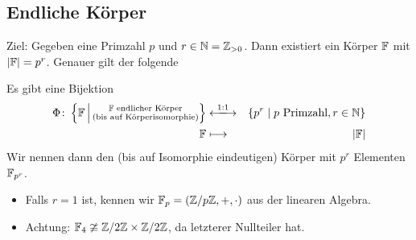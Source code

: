 \documentclass[12pt,a4paper]{scrartcl}
\begin{document}
\subsection{Endliche Körper}
Ziel: Gegeben eine Primzahl $p$ und $r\in\mathbb N= \mathbb Z_{>0}$. Dann existiert ein Körper $\mathbb F$ mit $|\mathbb F| = p^r$. Genauer gilt der folgende
\begin{satz}\label{thm:17.1}
	Es gibt eine Bijektion
	\begin{eqnarray*}
		\Phi\colon\left\{\IF\,\middle|\,\substack{\text{$\IF$ endlicher Körper}\\\text{\textup(bis auf Körperisomorphie\textup)}}\right\}& \xlongleftrightarrow{1:1}& \{p^r\mid \text{$p$ Primzahl}, r\in\IN\}\\
		\IF & \longmapsto & |\IF|
	\end{eqnarray*}
	Wir nennen dann den \textup(bis auf Isomorphie eindeutigen\textup) Körper mit $p^r$ Elementen $\mathbb F_{p^r}$.
\end{satz}
\begin{bem}
	\leavevmode
	\begin{itemize}
		\item Falls $r = 1$ ist, kennen wir $\mathbb F_p = (\mathbb Z/p\mathbb Z, +, \cdot)$ aus der linearen Algebra.
		\item Achtung: $\mathbb F_4 \ncong \mathbb Z/2\mathbb Z\times \mathbb Z/2\mathbb Z$, da letzterer Nullteiler hat.
	\end{itemize}
\end{bem}
\end{document}
